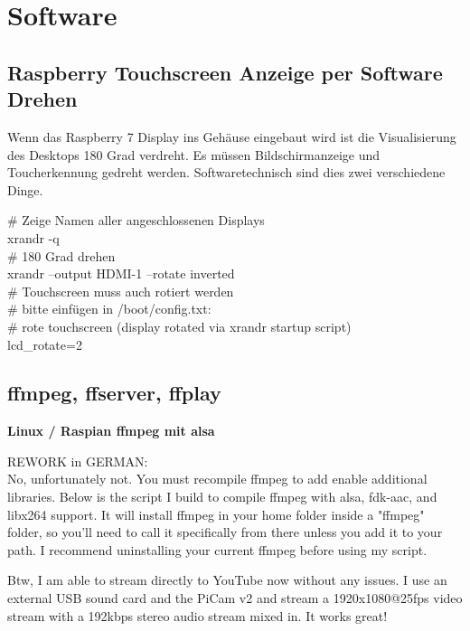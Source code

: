 \newpage
\section{Software}

\subsection{Raspberry Touchscreen Anzeige per Software Drehen}
Wenn das Raspberry 7\grqq{} Display ins Gehäuse eingebaut wird ist die 
Visualisierung des Desktops 180 Grad verdreht. Es müssen Bildschirmanzeige 
und Toucherkennung gedreht werden. Softwaretechnisch sind dies zwei verschiedene 
Dinge.

\# Zeige Namen aller angeschlossenen Displays\\
xrandr -q\\

\# 180 Grad drehen\\
xrandr --output HDMI-1 --rotate inverted\\

\# Touchscreen muss auch rotiert werden\\
\# bitte einfügen in /boot/config.txt:\\
\# rote touchscreen (display rotated via xrandr startup script)\\
lcd\_rotate=2\\

\subsection{ffmpeg, ffserver, ffplay}

\textbf{Linux / Raspian ffmpeg mit alsa} %
   
REWORK in GERMAN:\\
No, unfortunately not. You must recompile ffmpeg to add enable additional libraries. Below is the script I build to compile ffmpeg with alsa, fdk-aac, and libx264 support. It will install ffmpeg in your home folder inside a "ffmpeg" folder, so you'll need to call it specifically from there unless you add it to your path. I recommend uninstalling your current ffmpeg before using my script.

Btw, I am able to stream directly to YouTube now without any issues. I use an external USB sound card and the PiCam v2 and stream a 1920x1080@25fps video stream with a 192kbps stereo audio stream mixed in. It works great!

